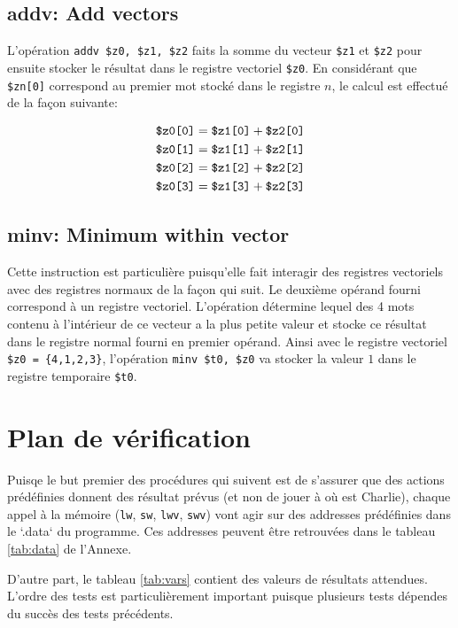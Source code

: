 \documentclass[a11paper]{article}
\newcommand{\vtt}[1]{%
  \text{\normalfont\ttfamily\detokenize{#1}}%
}
\begin{document}
\subsection{addv: Add vectors}

L'opération \verb|addv $z0, $z1, $z2| faits la somme du vecteur \verb|$z1| et
\verb|$z2| pour ensuite stocker le résultat dans le registre vectoriel
\verb|$z0|. En considérant que \verb|$zn[0]| correspond au premier mot stocké
dans le registre $n$, le calcul est effectué de la façon suivante:

\begin{align}
  \vtt{$z0[0]} &= \vtt{$z1[0]} + \vtt{$z2[0]} \\
  \vtt{$z0[1]} &= \vtt{$z1[1]} + \vtt{$z2[1]} \\
  \vtt{$z0[2]} &= \vtt{$z1[2]} + \vtt{$z2[2]} \\
  \vtt{$z0[3]} &= \vtt{$z1[3]} + \vtt{$z2[3]}
\end{align}

\subsection{minv: Minimum within vector}

Cette instruction est particulière puisqu'elle fait interagir des registres
vectoriels avec des registres normaux de la façon qui suit. Le deuxième opérand
fourni correspond à un registre vectoriel. L'opération détermine lequel des 4
mots contenu à l'intérieur de ce vecteur a la plus petite valeur et stocke ce
résultat dans le registre normal fourni en premier opérand. Ainsi avec le
registre vectoriel \verb|$z0 = {4,1,2,3}|, l'opération \verb|minv $t0, $z0| va
stocker la valeur $1$ dans le registre temporaire \verb|$t0|.

\section{Plan de vérification}

Puisqe le but premier des procédures qui suivent est de s'assurer que des
actions prédéfinies donnent des résultat prévus (et non de jouer à où est
Charlie), chaque appel à la mémoire (\verb|lw|, \verb|sw|, \verb|lwv|,
\verb|swv|) vont agir sur des addresses prédéfinies dans le `.data` du
programme. Ces addresses peuvent être retrouvées dans le tableau \ref{tab:data}
de l'Annexe.

D'autre part, le tableau \ref{tab:vars} contient des valeurs de résultats
attendues.
L'ordre des tests est particulièrement important puisque plusieurs tests
dépendes du succès des tests précédents.
\end{document}
